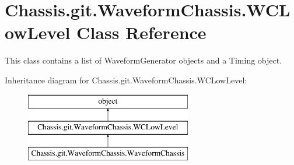 \hypertarget{class_chassis_8git_1_1_waveform_chassis_1_1_w_c_low_level}{\section{Chassis.\-git.\-Waveform\-Chassis.\-W\-C\-Low\-Level Class Reference}
\label{class_chassis_8git_1_1_waveform_chassis_1_1_w_c_low_level}
}


This class contains a list of Waveform\-Generator objects and a Timing object.  


Inheritance diagram for Chassis.\-git.\-Waveform\-Chassis.\-W\-C\-Low\-Level\-:\begin{figure}[H]
\begin{center}
\leavevmode
\includegraphics[height=3.000000cm]{class_chassis_8git_1_1_waveform_chassis_1_1_w_c_low_level}
\end{center}
\end{figure}
